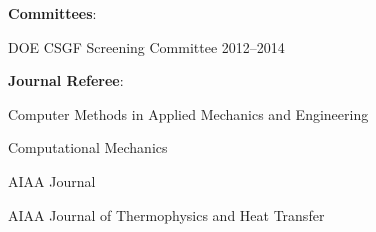\documentclass[12pt]{article}
\renewcommand{\section}[2]%
        {\pagebreak[2]\vspace{1.3\baselineskip}%
         \phantomsection\addcontentsline{toc}{section}{#1}%
         \hspace{0in}%
         \marginpar{
         \raggedright \scshape #1}#2}
\newenvironment{innerlist}[1][\enskip\textbullet]%
        {\begin{compactenum}[#1]}{\end{compactenum}}
\newcommand{\blankline}{\quad\pagebreak[2]}
\begin{document}
\blankline

\textbf{Committees}:
\begin{innerlist}
\item DOE CSGF Screening Committee 2012--2014
\end{innerlist}

\blankline


\textbf{Journal Referee}:
\begin{innerlist}
\item Computer Methods in Applied Mechanics and Engineering
\item Computational Mechanics
\item AIAA Journal
\item AIAA Journal of Thermophysics and Heat Transfer
\end{innerlist}

%
%
%
%
\end{document}
